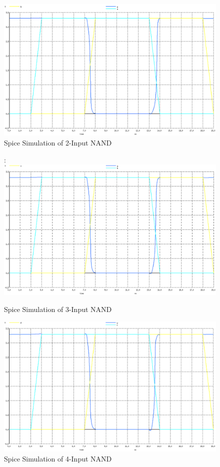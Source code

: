 \documentclass[12pt]{article}
\begin{document}
\begin{figure}[H]
	\centering
	\includegraphics[width=0.70\linewidth, keepaspectratio]{Graphics/2NAND_spice}
	\caption{Spice Simulation of 2-Input NAND}
	\label{fig:spice_2NAND}
\end{figure}

\begin{figure}[H]:
	\centering
	\includegraphics[width=0.70\linewidth, keepaspectratio]{Graphics/3NAND_spice}
	\caption{Spice Simulation of 3-Input NAND}
	\label{fig:spice_3NAND}
\end{figure}

\begin{figure}[H]
	\centering
	\includegraphics[width=0.70\linewidth, keepaspectratio]{Graphics/4NAND_spice}
	\caption{Spice Simulation of 4-Input NAND}
	\label{fig:spice_4NAND}
\end{figure}
\end{document}
